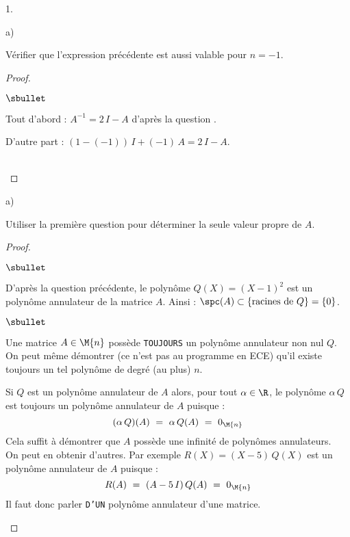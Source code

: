 \documentclass[11pt]{article}%
\begin{document}
\begin{noliste}{1.}
\begin{noliste}{a)}
    \newpage


  \item Vérifier que l'expression précédente est aussi valable pour
    $n=-1$.

    \begin{proof}~\\%
      \begin{noliste}{$\sbullet$}
      \item Tout d'abord : $A^{-1} = 2 \, I - A$ d'après la question
        .
      \item D'autre part : $(1 - (-1)) \, I + (-1) \, A = 2 \, I - A$.        
      \end{noliste}
      ~\\[-1.2cm] 
    \end{proof}
   \end{noliste}

\item 
  \begin{noliste}{a)}
    \setlength{\itemsep}{2mm}
  \item Utiliser la première question pour déterminer la seule valeur
    propre de $A$.

    \begin{proof}~%
      \begin{noliste}{$\sbullet$}
      \item D'après la question précédente, le polynôme $Q(X) = (X -
        1)^2$ est un polynôme annulateur de la matrice $A$. Ainsi :
        $\spc(A) \subset \{\text{racines de $Q$}\} = \{0\}$.%
      \end{noliste}
      \begin{remarkL}{.98}
        \begin{noliste}{$\sbullet$}
        \item Une matrice $A\in \M{n}$ possède {\tt TOUJOURS} un
          polynôme annulateur non nul $Q$.\\
          On peut même démontrer (ce n'est pas au programme en ECE)
          qu'il existe toujours un tel polynôme de degré (au plus)
          $n$.
	    
        \item Si $Q$ est un polynôme annulateur de $A$ alors, pour
          tout $\alpha \in \R$, le polynôme $\alpha \, Q$ est toujours
          un polynôme annulateur de $A$ puisque :
          \[
          (\alpha \, Q)(A) \ = \ \alpha \, Q(A) \ = \ 0_{\M{n}}
          \]
          Cela suffit à démontrer que $A$ possède une infinité de
          polynômes annulateurs.\\
          On peut en obtenir d'autres. Par exemple $R(X) = (X-5) \,
          Q(X)$ est un polynôme annulateur de $A$ puisque :
          \[
          R(A) \ = \ (A-5 \, I) \, Q(A) \ = \ 0_{\M{n}}
          \]
          Il faut donc parler {\tt D'UN} polynôme annulateur d'une
          matrice.
          

\end{noliste}
\end{remarkL}
\end{proof}
\end{noliste}
\end{noliste}
\end{document}
